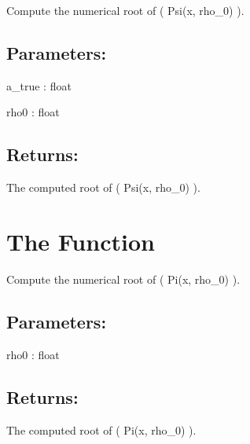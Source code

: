 \documentclass[a4paper,11pt,openany,english]{sphinxmanual}
\begin{document}
\begin{fulllineitems}
\label{\detokenize{api_biascorrection:xtremes.biascorrection.a1_asy}}
\pysigstartsignatures
{}
\pysigstopsignatures
\sphinxAtStartPar
Compute the numerical root of ( Psi(x, rho\_0) ).


\subsection{Parameters:}
\label{\detokenize{api_biascorrection:id21}}
\sphinxAtStartPar
a\_true : float

\sphinxAtStartPar
rho0 : float


\subsection{Returns:}
\label{\detokenize{api_biascorrection:id22}}\begin{description}
\sphinxAtStartPar
The computed root of ( Psi(x, rho\_0) ).

\end{description}

\end{fulllineitems}



\section{The  Function}
\label{\detokenize{api_biascorrection:the-varpi-function}}

\begin{fulllineitems}
\label{\detokenize{api_biascorrection:xtremes.biascorrection.varpi}}
\pysigstartsignatures
{}
\pysigstopsignatures
\sphinxAtStartPar
Compute the numerical root of ( Pi(x, rho\_0) ).


\subsection{Parameters:}
\label{\detokenize{api_biascorrection:id23}}
\sphinxAtStartPar
rho0 : float


\subsection{Returns:}
\label{\detokenize{api_biascorrection:id24}}\begin{description}
\sphinxAtStartPar
The computed root of ( Pi(x, rho\_0) ).

\end{description}

\end{fulllineitems}
\end{document}
